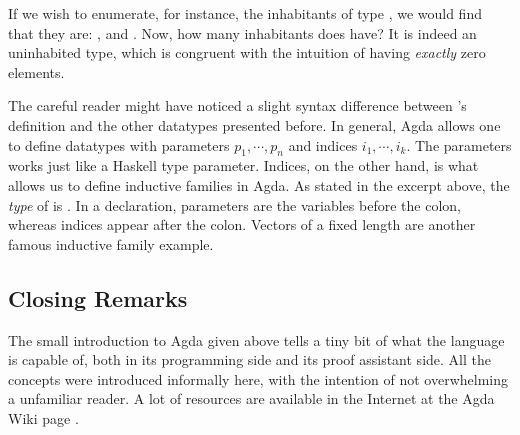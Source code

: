 
If we wish to enumerate, for instance, the inhabitants of type , we would find
that they are: ,  and . Now, how many inhabitants does  have?
It is indeed an uninhabited type, which is congruent with the intuition of having \emph{exactly} zero elements.

The careful reader might have noticed a slight syntax difference between 's definition
and the other datatypes presented before. In general, Agda allows one to define datatypes
with parameters $p_1, \cdots, p_n$ and indices $i_1 , \cdots, i_k$. The parameters works just like
a Haskell type parameter. Indices, on the other hand, is what allows us to define inductive families
in Agda. As stated in the excerpt above, the \emph{type} of  is .
In a  declaration, parameters are the variables before the colon, whereas indices appear after the colon.
Vectors of a fixed length are another famous inductive family example. 

\subsection{Closing Remarks}

The small introduction to Agda given above tells a tiny bit of what the language is capable of,
both in its programming side and its proof assistant side. All the concepts were introduced
informally here, with the intention of not overwhelming a unfamiliar reader. A lot of resources
are available in the Internet at the Agda Wiki page \cite{AgdaTutorials}. 



